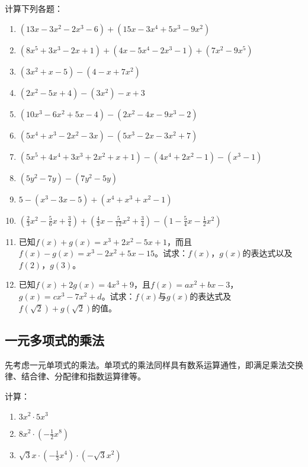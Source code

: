\begin{ex}
    计算下列各题：
\begin{enumerate}
    \item $(13x-3x^2-2x^3-6)+ (15x-3x^4+5x^3-9x^2)$
    \item $(8x^5+3x^3-2x+1)+(4x-5x^4-2x^3-1)+(7x^2-9x^5)$
    \item $(3x^2+x-5)-(4-x+7x^2)$
    \item $(2x^2-5x+4)-(3x^2)-x+3$
    \item $(10x^3-6x^2+5x-4)-(2x^2-4x-9x^3-2)$
    \item $(5x^4+x^3-2x^2-3x)-(5x^3-2x-3x^2+7)$
    \item $(5x^5+4x^4+3x^3+2x^2+x+1)-(4x^4+2x^2-1)-(x^3-1)$
    \item $(5y^2-7y)-(7y^2-5y)$
    \item $5-(x^3-3x-5)+(x^4+x^3+x^2-1)$
    \item $\left(\frac{2}{3}x^2-\frac{5}{6}x+\frac{3}{4}\right)+\left(\frac{4}{3}x-\frac{5}{12}x^2+\frac{3}{4}\right)-\left(1-\frac{5}{4}x-\frac{1}{2}x^2\right)$
    \item 已知$f(x)+g(x)=x^3+2x^2-5x+1$，而且$f(x)-g(x)=x^3-2x^2+5x-15$。试求：$f(x)$，$g(x)$的表达式以及$f(2)$，$g(3)$。
    \item 已知$f(x)+2g(x)=4x^3+9$，且$f(x)=ax^2+bx-3$，$g(x)=cx^3-7x^2+d$。试求：$f(x)$与$g(x)$的表达式及$f(\sqrt{2})+g(\sqrt{2})$的值。
\end{enumerate}
\end{ex}

\subsection{一元多项式的乘法}

先考虑一元单项式的乘法。单项式的乘法同样具有数系运算通性，即满足乘法交换律、结合律、分配律和指数运算律等。

\begin{example}
    计算：
    \begin{enumerate}
        \item $3x^2\cdot 5x^3$
        \item $8x^2\cdot \left(-\frac{1}{2}x^8\right)$
        \item $\sqrt{3}x\cdot \left(-\frac{1}{3}x^4\right)\cdot \left(-\sqrt{3}x^2\right)$
    \end{enumerate}

\end{example}

